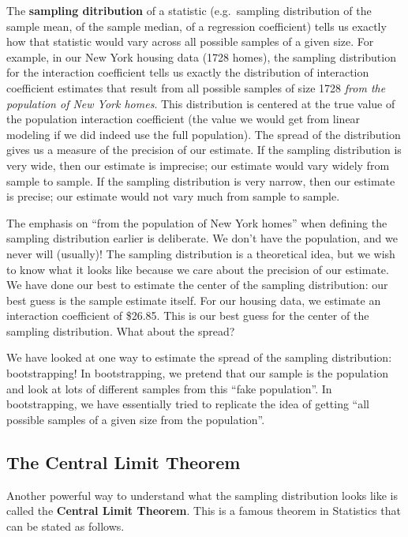 \documentclass[
]{book}
\begin{document}
The \textbf{sampling ditribution} of a statistic (e.g.~sampling distribution of the sample mean, of the sample median, of a regression coefficient) tells us exactly how that statistic would vary across all possible samples of a given size. For example, in our New York housing data (1728 homes), the sampling distribution for the interaction coefficient tells us exactly the distribution of interaction coefficient estimates that result from all possible samples of size 1728 \emph{from the population of New York homes}. This distribution is centered at the true value of the population interaction coefficient (the value we would get from linear modeling if we did indeed use the full population). The spread of the distribution gives us a measure of the precision of our estimate. If the sampling distribution is very wide, then our estimate is imprecise; our estimate would vary widely from sample to sample. If the sampling distribution is very narrow, then our estimate is precise; our estimate would not vary much from sample to sample.

The emphasis on ``from the population of New York homes'' when defining the sampling distribution earlier is deliberate. We don't have the population, and we never will (usually)! The sampling distribution is a theoretical idea, but we wish to know what it looks like because we care about the precision of our estimate. We have done our best to estimate the center of the sampling distribution: our best guess is the sample estimate itself. For our housing data, we estimate an interaction coefficient of \$26.85. This is our best guess for the center of the sampling distribution. What about the spread?

We have looked at one way to estimate the spread of the sampling distribution: bootstrapping! In bootstrapping, we pretend that our sample is the population and look at lots of different samples from this ``fake population''. In bootstrapping, we have essentially tried to replicate the idea of getting ``all possible samples of a given size from the population''.

\hypertarget{the-central-limit-theorem}{%
\subsection{The Central Limit Theorem}\label{the-central-limit-theorem}}

Another powerful way to understand what the sampling distribution looks like is called the \textbf{Central Limit Theorem}. This is a famous theorem in Statistics that can be stated as follows.
\end{document}
